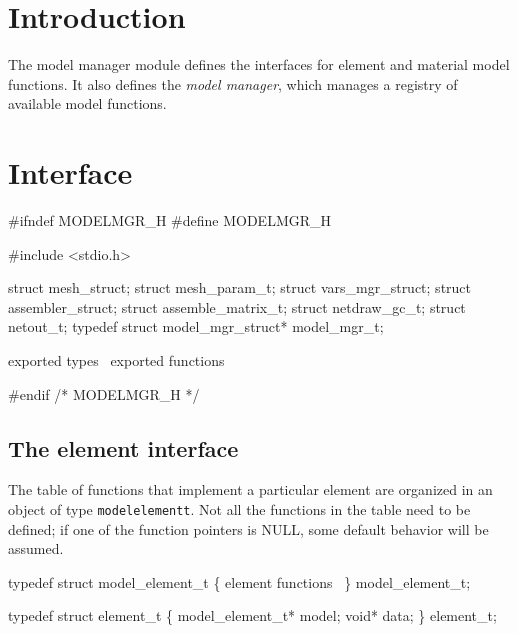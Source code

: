 
\section{Introduction}

The model manager module defines the interfaces for element and
material model functions.  It also defines the \emph{model manager},
which manages a registry of available model functions.


\section{Interface}

\endmoddef
#ifndef MODELMGR_H
#define MODELMGR_H

#include <stdio.h>

struct mesh_struct;
struct mesh_param_t;
struct vars_mgr_struct;
struct assembler_struct;
struct assemble_matrix_t;
struct netdraw_gc_t;
struct netout_t;
typedef struct model_mgr_struct* model_mgr_t;

\LA{}exported types~{\nwtagstyle{}}\RA{}
\LA{}exported functions~{\nwtagstyle{}}\RA{}

#endif /* MODELMGR_H */
\nwendcode{}\nwdocspar


\subsection{The element interface}

The table of functions that implement a particular element are organized
in an object of type {\tt{}model{}element{}t}.  Not all the functions in the
table need to be defined; if one of the function pointers is NULL, some
default behavior will be assumed.

\nwenddocs{}\endmoddef
typedef struct model_element_t \{
    \LA{}element functions~{\nwtagstyle{}}\RA{}
\} model_element_t;

typedef struct element_t \{
    model_element_t* model;
    void* data;
\} element_t;

\nwendcode{}\nwdocspar

